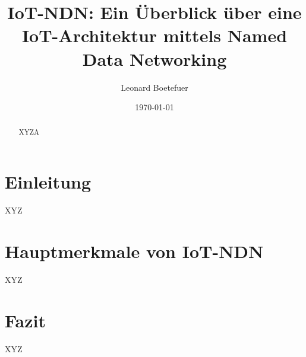 \documentclass[a4paper,12pt]{article}
\title{IoT-NDN: Ein Überblick über eine IoT-Architektur mittels Named Data Networking}
\author{Leonard Boetefuer}
\date{\today}
\begin{document}
\maketitle

\begin{abstract}
XYZA
\end{abstract}

\section{Einleitung}
XYZ
\section{Hauptmerkmale von IoT-NDN}
XYZ
\section{Fazit}
XYZ
\end{document}
